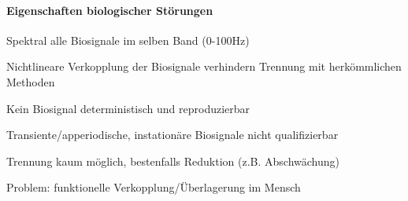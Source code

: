 \documentclass[a4paper]{article}
\begin{document}
\begin{multicols}{3}

  \paragraph{Eigenschaften biologischer Störungen}\label{eigenschaften-biologischer-störungen}

  \begin{itemize*}
    \item Spektral alle Biosignale im selben Band (0-100Hz)
    \item Nichtlineare Verkopplung der Biosignale verhindern Trennung mit herkömmlichen Methoden
    \item Kein Biosignal deterministisch und reproduzierbar
    \item Transiente/apperiodische, instationäre Biosignale nicht qualifizierbar
    \item Trennung kaum möglich, bestenfalls Reduktion (z.B. Abschwächung)
    \item Problem: funktionelle Verkopplung/Überlagerung im Mensch
  \end{itemize*}


\end{multicols}
\end{document}
